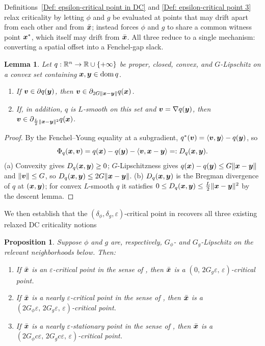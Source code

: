 \documentclass[english]{article}
\newtheorem{lemma}{Lemma}[section]
\newtheorem{proposition}{Proposition}[section]
\begin{document}
Definitions~\ref{Def: epsilon-critical point in DC} and
\ref{Def: epsilon-critical point 3} relax criticality by letting $\phi$
and $g$ be evaluated at points that may drift apart from each other and
from $\bar{\bm{x}}$;  instead forces $\phi$ and
$g$ to share a common witness point $\bm{x}^*$, which itself may drift from
$\bar{\bm{x}}$. All three reduce to a single mechanism: converting a spatial
offset into a Fenchel-gap slack.

\begin{lemma}
\label{lem:spatial-to-value}
Let $q:\mathbb{R}^n\to\mathbb{R}\cup\{+\infty\}$ be proper, closed, convex, and
$G$-Lipschitz on a convex set containing $\bm{x},\bm{y}\in\operatorname{dom}q$.
\begin{enumerate}
    \item[(a)] If $\bm{v}\in\partial q(\bm{y})$, then
    $\bm{v}\in\partial_{2G\|\bm{x}-\bm{y}\|}q(\bm{x})$.
    \item[(b)] If, in addition, $q$ is $L$-smooth on this set and
    $\bm{v}=\nabla q(\bm{y})$, then
    $\bm{v}\in\partial_{\frac{L}{2}\|\bm{x}-\bm{y}\|^2}q(\bm{x})$.
\end{enumerate}
\end{lemma}

\begin{proof}
By the Fenchel--Young equality at a subgradient,
$q^*(\bm{v})=\langle\bm{v},\bm{y}\rangle-q(\bm{y})$, so
\[
    \Phi_q(\bm{x},\bm{v})
    = q(\bm{x})-q(\bm{y})-\langle\bm{v},\bm{x}-\bm{y}\rangle
    =: D_q(\bm{x},\bm{y}).
\]
(a) Convexity gives $D_q(\bm{x},\bm{y})\ge0$; $G$-Lipschitzness gives
$q(\bm{x})-q(\bm{y})\le G\|\bm{x}-\bm{y}\|$ and $\|\bm{v}\|\le G$, so
$D_q(\bm{x},\bm{y})\le 2G\|\bm{x}-\bm{y}\|$.
(b) $D_q(\bm{x},\bm{y})$ is the Bregman divergence of $q$ at $(\bm{x},\bm{y})$; for
convex $L$-smooth $q$ it satisfies $0\le D_q(\bm{x},\bm{y})\le\tfrac
L2\|\bm{x}-\bm{y}\|^2$ by the descent lemma.
\end{proof}
We then establish that the $(\delta_\phi,\delta_g,\varepsilon)$-critical point in  recovers all three existing relaxed DC criticality notions
\begin{proposition}
\label{prop:recovery-existing-dc-criticality}
Suppose $\phi$ and $g$ are, respectively, $G_\phi$- and $G_g$-Lipschitz on
the relevant neighborhoods below. Then:
\begin{enumerate}
    \item[(i)] If $\bar{\bm{x}}$ is an $\varepsilon$-critical point in the
    sense of , then $\bar{\bm{x}}$ is a
    $(0,\,2G_g\varepsilon,\,\varepsilon)$-critical point.
    \item[(ii)] If $\bar{\bm{x}}$ is a nearly $\varepsilon$-critical point in
    the sense of , then $\bar{\bm{x}}$ is a
    $(2G_\phi\varepsilon,\,2G_g\varepsilon,\,\varepsilon)$-critical point.
    \item[(iii)] If $\bar{\bm{x}}$ is a nearly $\varepsilon$-stationary point in
    the sense of , then $\bar{\bm{x}}$ is a
    $(2G_\phi c\varepsilon,\,2G_g c\varepsilon,\,\varepsilon)$-critical
    point.
\end{enumerate}
\end{proposition}
\end{document}

